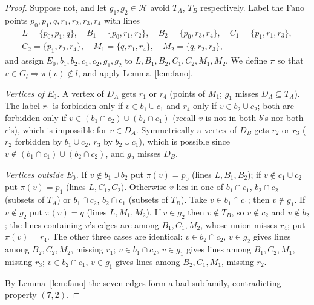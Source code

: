 \documentclass[11pt]{amsart}
\theoremstyle{definition}
\theoremstyle{remark}
\newcommand{\cH}{\mathcal H}
\begin{document}
\begin{proof}
Suppose not, and let $g_1,g_2\in\cH$ avoid $T_A$, $T_B$ respectively. Label the Fano points $p_0,p_1,q,r_1,r_2,r_3,r_4$ with lines
\[
\begin{gathered}
L=\{p_0,p_1,q\},\quad B_1=\{p_0,r_1,r_2\},\quad B_2=\{p_0,r_3,r_4\},\quad C_1=\{p_1,r_1,r_3\},\\ C_2=\{p_1,r_2,r_4\},\quad M_1=\{q,r_1,r_4\},\quad M_2=\{q,r_2,r_3\},
\end{gathered}
\]
and assign $E_0,b_1,b_2,c_1,c_2,g_1,g_2$ to $L,B_1,B_2,C_1,C_2,M_1,M_2$. We define $\pi$ so that $v\in G_l\Rightarrow\pi(v)\notin l$, and apply Lemma~\ref{lem:fano}.

\emph{Vertices of $E_0$.} A vertex of $D_A$ gets $r_1$ or $r_4$ (points of $M_1$; $g_1$ misses $D_A\subseteq T_A$). The label $r_1$ is forbidden only if $v\in b_1\cup c_1$ and $r_4$ only if $v\in b_2\cup c_2$; both are forbidden only if $v\in(b_1\cap c_2)\cup(b_2\cap c_1)$ (recall $v$ is not in both $b$'s nor both $c$'s), which is impossible for $v\in D_A$. Symmetrically a vertex of $D_B$ gets $r_2$ or $r_3$ ($r_2$ forbidden by $b_1\cup c_2$, $r_3$ by $b_2\cup c_1$), which is possible since $v\notin(b_1\cap c_1)\cup(b_2\cap c_2)$, and $g_2$ misses $D_B$.

\emph{Vertices outside $E_0$.} If $v\notin b_1\cup b_2$ put $\pi(v)=p_0$ (lines $L,B_1,B_2$); if $v\notin c_1\cup c_2$ put $\pi(v)=p_1$ (lines $L,C_1,C_2$). Otherwise $v$ lies in one of $b_1\cap c_1$, $b_2\cap c_2$ (subsets of $T_A$) or $b_1\cap c_2$, $b_2\cap c_1$ (subsets of $T_B$). Take $v\in b_1\cap c_1$; then $v\notin g_1$. If $v\notin g_2$ put $\pi(v)=q$ (lines $L,M_1,M_2$). If $v\in g_2$ then $v\notin T_B$, so $v\notin c_2$ and $v\notin b_2$; the lines containing $v$'s edges are among $B_1,C_1,M_2$, whose union misses $r_4$; put $\pi(v)=r_4$. The other three cases are identical: $v\in b_2\cap c_2$, $v\in g_2$ gives lines among $B_2,C_2,M_2$, missing $r_1$; $v\in b_1\cap c_2$, $v\in g_1$ gives lines among $B_1,C_2,M_1$, missing $r_3$; $v\in b_2\cap c_1$, $v\in g_1$ gives lines among $B_2,C_1,M_1$, missing $r_2$.

By Lemma~\ref{lem:fano} the seven edges form a bad subfamily, contradicting property $(7,2)$.
\end{proof}
\end{document}
